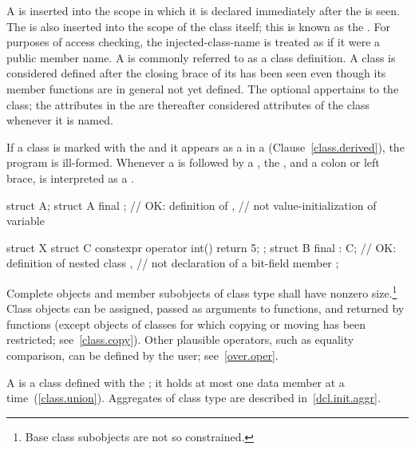 \pnum
A  is inserted into the scope in which it is
declared immediately after the  is seen. The
 is also inserted into the scope of the class
itself; this is known as the .
%
For purposes of access checking, the injected-class-name is treated as
if it were a public member name.
%
A  is commonly referred to as a class
definition.
%
A class is considered defined after the closing brace of its
 has been seen even though its member
functions are in general not yet defined.
The optional  appertains to the class; the attributes in
the  are thereafter considered attributes of the class
whenever it is named.

\pnum
If a class is marked with the   and it appears
as a  in a 
(Clause~\ref{class.derived}), the program is ill-formed. Whenever a
 is followed by a , the
 , and a colon or left brace,  is
interpreted as a . \enterexample
\begin{codeblock}
struct A;
struct A final {};      // OK: definition of ,
                        // not value-initialization of variable 

struct X {
 struct C { constexpr operator int() { return 5; } };
 struct B final : C{};  // OK: definition of nested class ,
                        // not declaration of a bit-field member 
};
\end{codeblock}
\exitexample

\pnum
Complete objects and member subobjects of class type shall have nonzero
size.\footnote{Base class subobjects are not so constrained.}
\enternote
Class objects can be assigned, passed as arguments to functions, and
returned by functions (except objects of classes for which copying or moving has
been restricted; see~\ref{class.copy}). Other plausible operators, such
as equality comparison, can be defined by the user; see~\ref{over.oper}.
\exitnote

\pnum
{}%
%
%
A  is a class defined with the 
;
%
it holds at most one data member at a time~(\ref{class.union}).
\enternote
Aggregates of class type are described in~\ref{dcl.init.aggr}.
\exitnote

